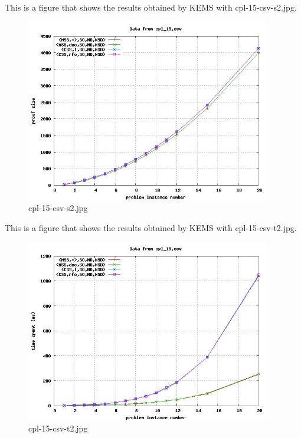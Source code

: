 This is a figure that shows the results obtained by KEMS with cpl-15-csv-s2.jpg.
\begin{figure}[htbp]
\begin{center}
\includegraphics[width=0.95\textwidth]{figuras/cpl-15-csv-s2.jpg}
\end{center}
\caption{cpl-15-csv-s2.jpg}
\end{figure}

This is a figure that shows the results obtained by KEMS with cpl-15-csv-t2.jpg.
\begin{figure}[htbp]
\begin{center}
\includegraphics[width=0.95\textwidth]{figuras/cpl-15-csv-t2.jpg}
\end{center}
\caption{cpl-15-csv-t2.jpg}
\end{figure}

